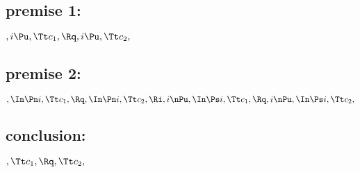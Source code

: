 \subsection{premise 1:}
\begin{math}
, i \Pu, \Tt c_1, \Rq , i \Pu, \Tt c_2,
\end{math}
\bigskip
\bigskip
\subsection{premise 2:}
\begin{math}
, \In \Pn i, \Tt c_1 , \Rq , \In \Pn i, \Tt c_2 , \Ri \\\\
,i \nPu, \In \Ps i, \Tt c_1, \Rq , i \nPu, \In \Ps i, \Tt c_2,
\end{math}
\bigskip
\bigskip
\subsection{conclusion:}
\begin{math}
, \Tt c_1, \Rq , \Tt c_2,
\end{math}



\newpage